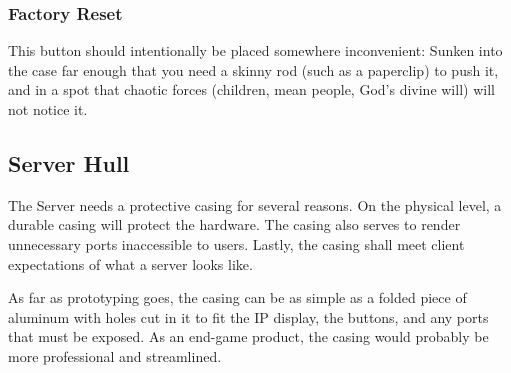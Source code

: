 \subsubsection{Factory Reset}
This button should intentionally be placed somewhere inconvenient: 
Sunken into the case far enough that you need a skinny rod (such as a paperclip) to push it, and in a spot
that chaotic forces (children, mean people, God's divine will) will not notice it.
	
\subsection{Server Hull}
The Server needs a protective casing for several reasons. 
On the physical level, a durable casing will protect the hardware. 
The casing also serves to render unnecessary ports inaccessible to users. 
Lastly, the casing shall meet client expectations of what a server looks like.

As far as prototyping goes, the casing can be as simple as a folded piece of aluminum
with holes cut in it to fit the IP display, the buttons, and any ports that must be
exposed. As an end-game product, the casing would probably be more professional and streamlined.
